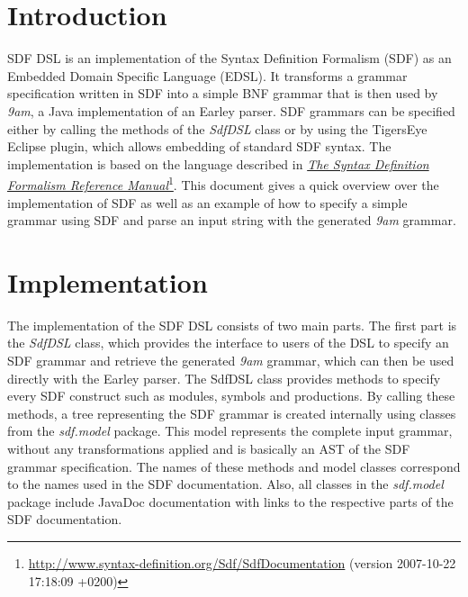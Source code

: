 \documentclass[article,linedtoc,colorback,accentcolor=tud4c,10pt]{tudreport}
\title{\myTitle}
\subtitle{\myAuthor}
\newcommand{\J}[1]{\textit{#1}}
\newcommand{\Jclass}[1]{\J{#1}}
\newcommand{\Jpkg}[1]{\J{#1}}
\begin{document}
\maketitle

  \section{Introduction}

SDF DSL is an implementation of the Syntax Definition Formalism (SDF) as an Embedded Domain Specific Language (EDSL).
It transforms a grammar specification written in SDF into a simple BNF grammar that is then used by \emph{9am}, a Java implementation of an Earley parser. SDF grammars can be specified either by calling the methods of the \Jclass{SdfDSL} class or by using the TigersEye Eclipse plugin, which allows embedding of standard SDF syntax.
The implementation is based on the language described in \href{http://homepages.cwi.nl/~daybuild/daily-books/syntax/2-sdf/sdf.html}{\emph{The Syntax Definition Formalism Reference Manual}}\footnote{\url{http://www.syntax-definition.org/Sdf/SdfDocumentation} (version 2007-10-22 17:18:09 +0200)}.
This document gives a quick overview over the implementation of SDF as well as an example of how to specify a simple grammar using SDF and parse an input string with the generated \emph{9am} grammar.

\hspace{0.5em}
	\section{Implementation}

The implementation of the SDF DSL consists of two main parts. The first part is the \Jclass{SdfDSL} class, which provides the interface to users of the DSL to specify an SDF grammar and retrieve the generated \emph{9am} grammar, which can then be used directly with the Earley parser. The SdfDSL class provides methods to specify every SDF construct such as modules, symbols and productions.
By calling these methods, a tree representing the SDF grammar is created internally using classes from the \Jpkg{sdf.model} package. This model represents the complete input grammar, without any transformations applied and is basically an AST of the SDF grammar specification. The names of these methods and model classes correspond to the names used in the SDF documentation. Also, all classes in the \Jpkg{sdf.model} package include JavaDoc documentation with links to the respective parts of the SDF documentation.
\end{document}
